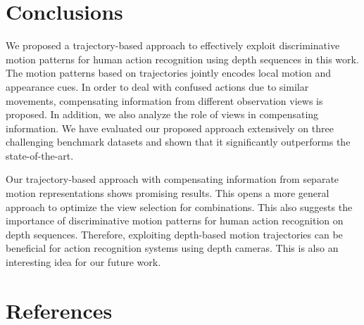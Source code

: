 \documentclass[final,3p,times,twocolumn]{elsarticle}
\begin{document}
\section{Conclusions}
\label{Section_Conclusions}

We proposed a trajectory-based approach to effectively exploit discriminative motion patterns for human action recognition using depth sequences in this work.
The motion patterns based on trajectories jointly encodes local motion and appearance cues.
In order to deal with confused actions due to similar movements, compensating information from different observation views is proposed.
In addition, we also analyze the role of views in compensating information.
We have evaluated our proposed approach extensively on three challenging benchmark datasets and shown that it significantly outperforms the state-of-the-art.

Our trajectory-based approach with compensating information from separate motion representations shows promising results.
This opens a more general approach to optimize the view selection for combinations.
This also suggests the importance of discriminative motion patterns for human action recognition on depth sequences.
Therefore, exploiting depth-based motion trajectories can be beneficial for action recognition systems using depth cameras.
This is also an interesting idea for our future work.

\section*{References}



\end{document}
